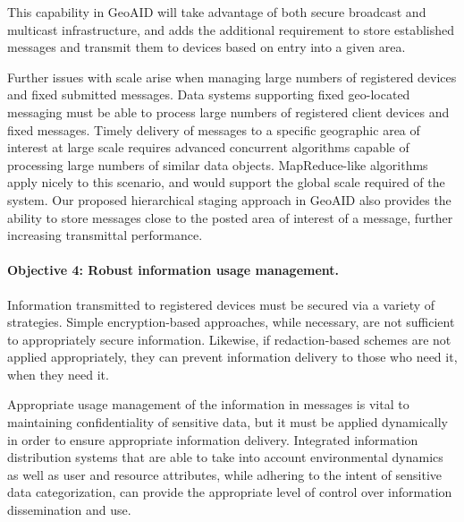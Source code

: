 \documentclass{sbir}
\begin{document}
This capability in GeoAID will take advantage of both secure broadcast and multicast infrastructure, and adds the additional requirement to store established messages and transmit them to devices based on entry into a given area.

Further issues with scale arise when managing large numbers of registered devices and fixed submitted messages. Data systems supporting fixed geo-located messaging must be able to process large numbers of registered client devices and fixed messages. Timely delivery of messages to a specific geographic area of interest at large scale requires advanced concurrent algorithms capable of processing large numbers of similar data objects. MapReduce-like algorithms apply nicely to this scenario, and would support the global scale required of the system. Our proposed hierarchical staging approach in GeoAID also provides the ability to store messages close to the posted area of interest of a message, further increasing transmittal performance.

\paragraph{Objective 4: Robust information usage management.} Information transmitted to registered devices must be secured via a variety of strategies. Simple encryption-based approaches, while necessary, are not sufficient to appropriately secure information. Likewise, if redaction-based schemes are not applied appropriately, they can prevent information delivery to those who need it, when they need it.

Appropriate usage management of the information in messages is vital to maintaining confidentiality of sensitive data, but it must be applied dynamically in order to ensure appropriate information delivery. Integrated information distribution systems that are able to take into account environmental dynamics as well as user and resource attributes, while adhering to the intent of sensitive data categorization, can provide the appropriate level of control over information dissemination and use.
\end{document}
